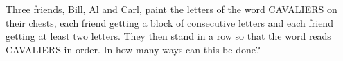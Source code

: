 Three friends, Bill, Al and Carl, paint the letters of the word CAVALIERS on their chests, each friend getting a block of consecutive letters and each friend getting at least two letters. They then stand in a row so that the word reads CAVALIERS in order. In how many ways can this be done?
